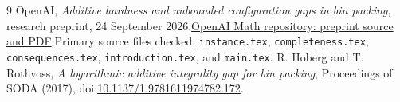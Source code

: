 \documentclass[11pt,a4paper]{article}
\begin{document}
\begin{thebibliography}{9}
 OpenAI, \emph{Additive hardness and unbounded configuration gaps in bin packing}, research preprint, 24 September 2026.\newline\href{https://github.com/openai/math/tree/main/preprints/Additive-hardness-and-unbounded-configuration-gaps-in-bin-packing-September-24-2026}{OpenAI Math repository: preprint source and PDF}.\newline Primary source files checked: \texttt{instance.tex}, \texttt{completeness.tex}, \texttt{consequences.tex}, \texttt{introduction.tex}, and \texttt{main.tex}.
 R. Hoberg and T. Rothvoss, \emph{A logarithmic additive integrality gap for bin packing}, Proceedings of SODA (2017), doi:\href{https://doi.org/10.1137/1.9781611974782.172}{10.1137/1.9781611974782.172}.
\end{thebibliography}
\end{document}
